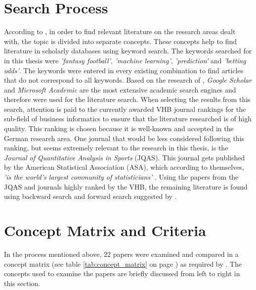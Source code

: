 \clearpage \section{Search Process}
According to \citet{vom_brocke_standing_2015}, in order to find relevant literature on the research areas dealt with, the topic is divided into separate concepts. These concepts help to find literature in scholarly databases using keyword search. The keywords searched for in this thesis were \emph{'fantasy football'}, \emph{'machine learning'}, \emph{'prediction'} and \emph{'betting odds'}. The keywords were entered in every existing combination to find articles that do not correspond to all keywords. Based on the research of \citet{gusenbauer_google_2019}, \emph{Google Scholar} and \emph{Microsoft Academic} are the most extensive academic search engines and therefore were used for the literature search. When selecting the results from this search, attention is paid to the currently awarded VHB journal rankings \parencite[see][]{vhb_e_v_vhb-jourqual3_2015} for the sub-field of business informatics to ensure that the literature researched is of high quality. This ranking is chosen because it is well-known and accepted in the German research area. One journal that would be less considered following this ranking, but seems extremely relevant to the research in this thesis, is the \emph{Journal of Quantitative Analysis in Sports} (JQAS). This journal gets published by the American Statistical Association (ASA), which according to themselves, \emph{'is the world's largest community of statisticians'} \parencite[see][]{noauthor_about_nodate}. Using the papers from the JQAS and journals highly ranked by the VHB, the remaining literature is found using backward search and forward search suggested by \citet{webster_guest_2002}.

\section{Concept Matrix and Criteria}

In the process mentioned above, 22 papers were examined and compared in a concept matrix (see table \ref{tab:concept_matrix} on page \pageref{tab:concept_matrix}) as required by \citet{webster_guest_2002}. The concepts used to examine the papers are briefly discussed from left to right in this section. \clearpage

